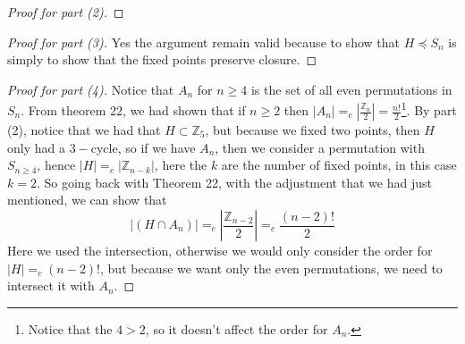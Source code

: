 \begin{assignment}[
  header=HeaderA,
  body=BodyA,
  title={Homework 3},
  duedate={26 February, 2026},
  toc=false,
  toctitle={This appears on the Table of contents.},
  exlist=false
]
\begin{exer}[Problem 5.44]
\begin{proof}[Proof for part (2)]
\end{proof}
\begin{proof}[Proof for part (3)]
Yes the argument remain valid because to show that $H \preccurlyeq S_n$ is simply to show that the fixed points preserve closure.     
\end{proof}
\begin{proof}[Proof for part (4)]
Notice that $A_n$ for $n \geq 4$ is the set of all even permutations in $S_n$. From theorem 22, we had shown that if $n \geq 2$ then $|A_n| =_c |\frac{\mathbb{Z}_n}{2}|  = \frac{n!}{2}$\footnote{Notice that the $4 > 2$, so it doesn't affect the order for $A_n$.}. By part (2), notice that we had that $H \subset \mathbb{Z}_5$, but because we fixed two points, then $H$ only had a $3-$cycle, so if we have $A_n$, then we consider a permutation with $S_{n\geq 4}$, hence $|H| =_c |\mathbb{Z}_{n-k}|$, here the $k$ are the number of fixed points, in this case $k = 2$. So going back with Theorem 22, with the adjustment that we had just mentioned, we can show that
\[
|(H \cap A_n)| =_c |\frac{\mathbb{Z}_{n-2}}{2}| =_c \frac{(n-2)!}{2}
\]
Here we used the intersection, otherwise we would only consider the order for $|H| =_c (n-2)!$, but because we want only the even permutations, we need to intersect it with $A_n$.
\end{proof}
\end{exer}


\end{assignment}
